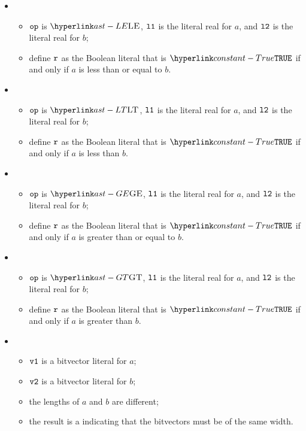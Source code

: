 \begin{itemize}
  \item {}
  \begin{itemize}
    \item $\texttt{op}$ is $\LE$, $\texttt{l1}$ is the literal real for $a$, and $\texttt{l2}$ is the literal real for $b$;
    \item define $\texttt{r}$ as the Boolean literal that is $\True$ if and only if $a$ is less than or equal to $b$.
  \end{itemize}

  \item {}
  \begin{itemize}
    \item $\texttt{op}$ is $\LT$, $\texttt{l1}$ is the literal real for $a$, and $\texttt{l2}$ is the literal real for $b$;
    \item define $\texttt{r}$ as the Boolean literal that is $\True$ if and only if $a$ is less than $b$.
  \end{itemize}

  \item {}
  \begin{itemize}
    \item $\texttt{op}$ is $\GE$, $\texttt{l1}$ is the literal real for $a$, and $\texttt{l2}$ is the literal real for $b$;
    \item define $\texttt{r}$ as the Boolean literal that is $\True$ if and only if $a$ is greater than or equal to $b$.
  \end{itemize}

  \item {}
  \begin{itemize}
    \item $\texttt{op}$ is $\GT$, $\texttt{l1}$ is the literal real for $a$, and $\texttt{l2}$ is the literal real for $b$;
    \item define $\texttt{r}$ as the Boolean literal that is $\True$ if and only if $a$ is greater than $b$.
  \end{itemize}

  \item {}
  \begin{itemize}
    \item $\texttt{v1}$ is a bitvector literal for $a$;
    \item $\texttt{v2}$ is a bitvector literal for $b$;
    \item the lengths of $a$ and $b$ are different;
    \item the result is a \typingerrorterm{} indicating that the bitvectors must be of the same width.
  \end{itemize}


\end{itemize}
